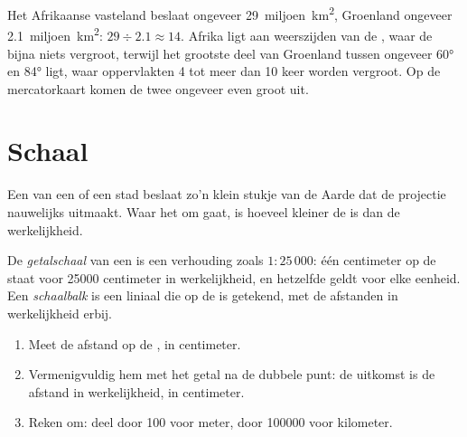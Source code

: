 \begin{example}
Het Afrikaanse vasteland beslaat ongeveer 29~miljoen~\unit{km^2}, Groenland
ongeveer 2.1~miljoen~\unit{km^2}: $29 \div 2.1 \approx 14$. Afrika ligt aan
weerszijden van de , waar de  bijna niets vergroot,
terwijl het grootste deel van Groenland tussen ongeveer \ang{60} en
\ang{84}  ligt, waar oppervlakten 4 tot meer dan 10 keer
worden vergroot. Op de mercatorkaart komen de twee ongeveer even groot uit.
\end{example}

\section{Schaal}

Een  van een  of een stad beslaat zo'n klein stukje van de Aarde
dat de projectie nauwelijks uitmaakt. Waar het om gaat, is hoeveel kleiner
de  is dan de werkelijkheid.

\begin{definition}\label{def:g9:maps-of-the-earth:numerical-scale}
De \emph{getalschaal} van een  is een verhouding
zoals $1 : 25\,000$: één centimeter op de  staat voor \num{25000}
centimeter in werkelijkheid, en hetzelfde geldt voor elke eenheid. Een
\emph{schaalbalk} is een liniaal die op de  is
getekend, met de afstanden in werkelijkheid erbij.
\end{definition}

\begin{method}
\begin{enumerate}
  \item Meet de afstand op de , in centimeter.
  \item Vermenigvuldig hem met het getal na de dubbele punt: de uitkomst is
        de afstand in werkelijkheid, in centimeter.
  \item Reken om: deel door 100 voor meter, door \num{100000} voor kilometer.
\end{enumerate}
\end{method}

